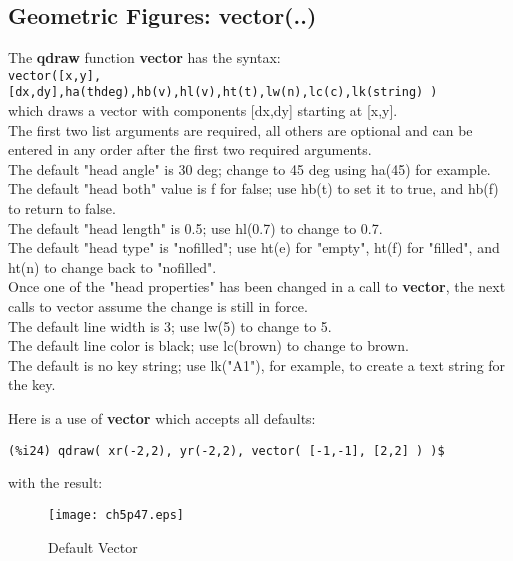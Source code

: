 \documentclass[12pt]{article}
\begin{document}
\subsection{Geometric Figures: vector(..)  }
The \textbf{qdraw} function \textbf{vector} has the syntax:\\
\verb|vector([x,y],[dx,dy],ha(thdeg),hb(v),hl(v),ht(t),lw(n),lc(c),lk(string) )|\\
   which draws a vector with components [dx,dy] starting at [x,y].\\
The first two list arguments are required, all others are optional and can be entered in
   any order after the first two required arguments.\\
The default "head angle" is 30 deg; change to 45 deg using ha(45) for example.\\
The default "head both" value is f for false; use hb(t) to set it to true,
       and hb(f) to return to false.\\
The default "head length" is 0.5; use hl(0.7) to change to 0.7.\\
The default "head type" is "nofilled"; use ht(e) for "empty", ht(f) for "filled",
       and ht(n) to change back to "nofilled".           \\
Once one of the "head properties" has been changed in a call to \textbf{vector},
   the next calls to vector assume the change is still in force. \\	   
The default line width is 3; use lw(5) to change to 5.\\
The default line color is black; use lc(brown) to change to brown.\\
The default is no key string; use lk("A1"), for example, to create a text string for the key.\\

\newpage

Here is a use of \textbf{vector} which accepts all defaults:
\small
\begin{verbatim}
(%i24) qdraw( xr(-2,2), yr(-2,2), vector( [-1,-1], [2,2] ) )$
\end{verbatim}
\normalsize
%
with the result:
\begin{figure} [h]
   \centerline{\texttt{[image: ch5p47.eps]} }
	\caption{Default Vector}
\end{figure}      
\end{document}
